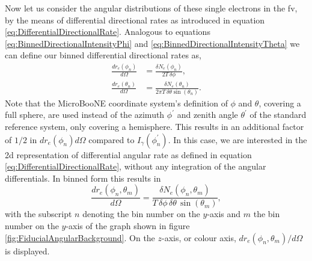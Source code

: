 Now let us consider the angular distributions of these single electrons in the \gls{fv}, by the means of differential directional rates as introduced in equation \ref{eq:DifferentialDirectionalRate}. Analogous to equations \ref{eq:BinnedDirectionalIntensityPhi} and \ref{eq:BinnedDirectionalIntensityTheta} we can define our binned differential directional rates as,
\begin{align}\label{eq:BinnedDirectionalRatePhi}
    \frac{dr_e(\phi_n)}{d\Omega} &= \frac{\delta N_e(\phi_n)}{2T \, \delta\phi}, \\[5pt]
    \frac{dr_e(\theta_n)}{d\Omega} &= \frac{\delta N_e(\theta_n)}{2\pi T\, \delta\theta\sin{(\theta_n)}}.
    \label{eq:BinnedDirectionalRateTheta}
\end{align}
Note that the MicroBooNE coordinate system's definition of $\phi$ and $\theta$, covering a full sphere, are used instead of the azimuth $\phi^\prime$ and zenith angle $\theta^\prime$ of the standard reference system, only covering a hemisphere. This results in an additional factor of $1/2$ in $dr_e(\phi_n)d\Omega$ compared to $I_\gamma(\phi_n^\prime)$. In this case, we are interested in the \gls{2d} representation of differential angular rate as defined in equation \ref{eq:DifferentialDirectionalRate}, without any integration of the angular differentials. In binned form this results in
\begin{equation}\label{eq:BinnedDirectionalRatePhiTheta}
     \frac{dr_e(\phi_n,\theta_m)}{d\Omega} = \frac{\delta N_e(\phi_n,\theta_m)}{T\, \delta\phi \, \delta\theta \, \sin{(\theta_m)}},
\end{equation}
with the subscript $n$ denoting the bin number on the $y$-axis and $m$ the bin number on the $y$-axis of the graph shown in figure \ref{fig:FiducialAngularBackground}. On the $z$-axis, or colour axis, $dr_e(\phi_n,\theta_m)/d\Omega$ is displayed.
